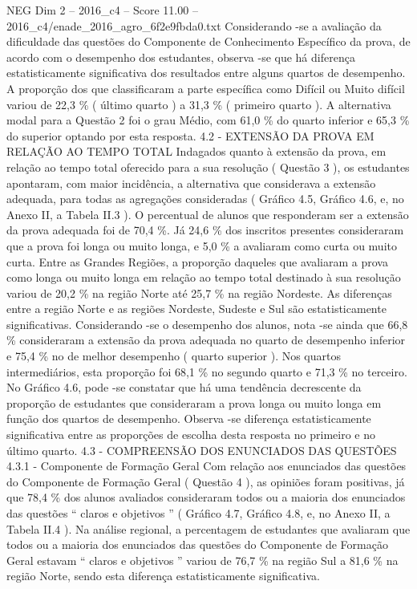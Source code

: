 \begin{textsample}{NEG Dim 2 – 2016\_c4 – Score 11.00 – 2016\_c4/enade\_2016\_agro\_6f2e9fbda0.txt}
Considerando -se a avaliação da dificuldade das questões do Componente de Conhecimento Específico da prova, de acordo com o desempenho dos estudantes, observa -se que há diferença estatisticamente significativa dos resultados entre alguns quartos de desempenho.
A proporção dos que classificaram a parte específica como Difícil ou Muito difícil variou de 22,3 \% ( último quarto ) a 31,3 \% ( primeiro quarto ).
A alternativa modal para a Questão 2 foi o grau Médio, com 61,0 \% do quarto inferior e 65,3 \% do superior optando por esta resposta. 4.2 - EXTENSÃO DA PROVA EM RELAÇÃO AO TEMPO TOTAL Indagados quanto à extensão da prova, em relação ao tempo total oferecido para a sua resolução ( Questão 3 ), os estudantes apontaram, com maior incidência, a alternativa que considerava a extensão adequada, para todas as agregações consideradas ( Gráfico 4.5, Gráfico 4.6, e, no Anexo II, a Tabela II.3 ).
O percentual de alunos que responderam ser a extensão da prova adequada foi de 70,4 \%.
Já 24,6 \% dos inscritos presentes consideraram que a prova foi longa ou muito longa, e 5,0 \% a avaliaram como curta ou muito curta.
Entre as Grandes Regiões, a proporção daqueles que avaliaram a prova como longa ou muito longa em relação ao tempo total destinado à sua resolução variou de 20,2 \% na região Norte até 25,7 \% na região Nordeste.
As diferenças entre a região Norte e as regiões Nordeste, Sudeste e Sul são estatisticamente significativas.
Considerando -se o desempenho dos alunos, nota -se ainda que 66,8 \% consideraram a extensão da prova adequada no quarto de desempenho inferior e 75,4 \% no de melhor desempenho ( quarto superior ).
Nos quartos intermediários, esta proporção foi 68,1 \% no segundo quarto e 71,3 \% no terceiro.
No Gráfico 4.6, pode -se constatar que há uma tendência decrescente da proporção de estudantes que consideraram a prova longa ou muito longa em função dos quartos de desempenho.
Observa -se diferença estatisticamente significativa entre as proporções de escolha desta resposta no primeiro e no último quarto. 4.3 - COMPREENSÃO DOS ENUNCIADOS DAS QUESTÕES 4.3.1 - Componente de Formação Geral Com relação aos enunciados das questões do Componente de Formação Geral ( Questão 4 ), as opiniões foram positivas, já que 78,4 \% dos alunos avaliados consideraram todos ou a maioria dos enunciados das questões “ claros e objetivos ” ( Gráfico 4.7, Gráfico 4.8, e, no Anexo II, a Tabela II.4 ).
Na análise regional, a percentagem de estudantes que avaliaram que todos ou a maioria dos enunciados das questões do Componente de Formação Geral estavam “ claros e objetivos ” variou de 76,7 \% na região Sul a 81,6 \% na região Norte, sendo esta diferença estatisticamente significativa.

\end{textsample}
